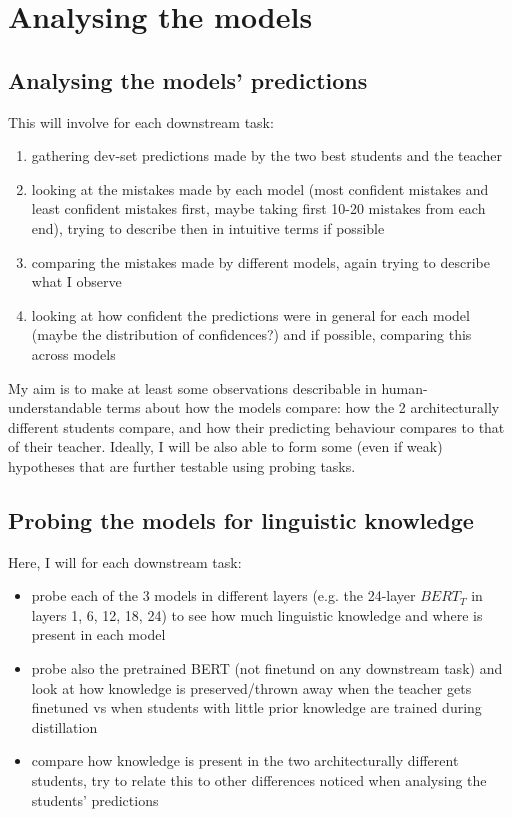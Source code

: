 \documentclass[bsc,frontabs,twoside,singlespacing,parskip,deptreport]{infthesis}
\begin{document}
\chapter{Analysing the models}{
  \section{Analysing the models' predictions}{
    This will involve for each downstream task:
    \begin{enumerate}
      \item gathering dev-set predictions made by the two best students and the teacher
      \item looking at the mistakes made by each model (most confident mistakes and least confident mistakes first, maybe taking first 10-20 mistakes from each end), trying to describe then in intuitive terms if possible
      \item comparing the mistakes made by different models, again trying to describe what I observe
      \item looking at how confident the predictions were in general for each model (maybe the distribution of confidences?) and if possible, comparing this across models
    \end{enumerate}

    My aim is to make at least some observations describable in human-understandable terms about how the models compare: how the 2 architecturally different students compare, and how their predicting behaviour compares to that of their teacher.
    Ideally, I will be also able to form some (even if weak) hypotheses that are further testable using probing tasks.
  }

  \section{Probing the models for linguistic knowledge}{
    Here, I will for each downstream task:
    \begin{itemize}
      \item probe each of the 3 models in different layers (e.g. the 24-layer $BERT_T$ in layers 1, 6, 12, 18, 24) to see how much linguistic knowledge and where is present in each model
      \item probe also the pretrained BERT (not finetund on any downstream task) and look at how knowledge is preserved/thrown away when the teacher gets finetuned vs when students with little prior knowledge are trained during distillation
      \item compare how knowledge is present in the two architecturally different students, try to relate this to other differences noticed when analysing the students' predictions
    \end{itemize}

}}
\end{document}

